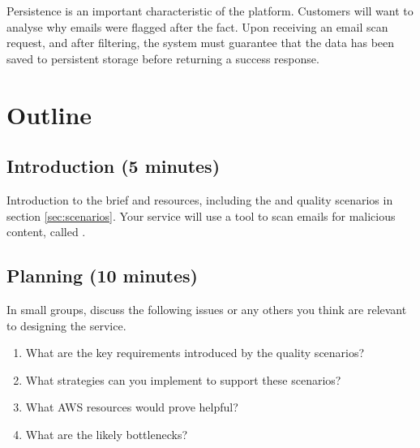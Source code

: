 \documentclass{csse4400}
\begin{document}
Persistence is an important characteristic of the platform.
Customers will want to analyse why emails were flagged after the fact.
Upon receiving an email scan request, and after filtering,
the system must guarantee that the data has been saved to persistent storage before returning a success response.


\section{Outline}

\subsection*{Introduction (5 minutes)}
Introduction to the brief and resources,
including the 
and quality scenarios in section \ref{sec:scenarios}.
Your service will use a tool to scan emails for malicious content,
called .

\subsection*{Planning (10 minutes)}
In small groups, discuss the following issues or any others you think are relevant to designing the service.

\begin{enumerate}
    \item What are the key requirements introduced by the quality scenarios?
    \item What strategies can you implement to support these scenarios?
    \item What AWS resources would prove helpful?
    \item What are the likely bottlenecks?
\end{enumerate}
\end{document}
